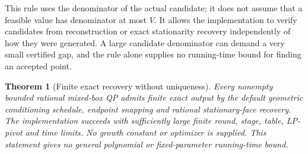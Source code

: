 \documentclass[11pt]{article}
\newtheorem{theorem}{Theorem}[section]
\theoremstyle{remark}
\begin{document}
This rule uses the denominator of the actual candidate; it does not
assume that a feasible value has denominator at most $V$. It allows the
implementation to verify candidates from reconstruction or exact
stationarity recovery independently of how they were generated. A large
candidate denominator can demand a very small certified gap, and the
rule alone supplies no running-time bound for finding an accepted point.

\begin{theorem}[Finite exact recovery without uniqueness]
\label{thm:generalfinite}
Every nonempty bounded rational mixed-box QP admits finite exact output
by the default geometric conditioning schedule, endpoint snapping and
rational stationary-face recovery. The implementation succeeds with
sufficiently large finite round, stage, table, LP-pivot and time limits.
No growth constant or optimizer is supplied. This statement gives no
general polynomial or fixed-parameter running-time bound.
\end{theorem}
\end{document}
